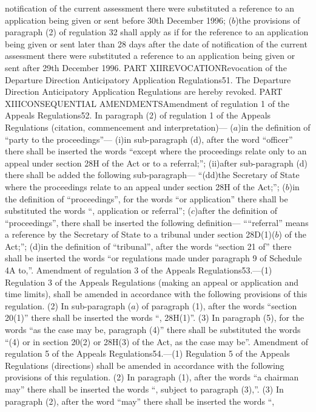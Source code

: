 \documentclass[a4paper]{article}
\begin{document}
notification of the current assessment there were substituted a reference to an
application being given or sent before 30th December 1996;
($b$)the provisions of paragraph (2) of regulation 32 shall apply as if for the
reference to an application being given or sent later than 28 days after the
date of notification of the current assessment there were substituted a
reference to an application being given or sent after 29th December 1996.
PART XIIREVOCATIONRevocation of the Departure Direction Anticipatory Application
Regulations51. The Departure Direction Anticipatory Application Regulations are
hereby revoked.
PART XIIICONSEQUENTIAL AMENDMENTSAmendment of regulation 1 of the Appeals
Regulations52. In paragraph (2) of regulation 1 of the Appeals Regulations
(citation, commencement and interpretation)—
($a$)in the definition of “party to the proceedings”—
(i)in sub-paragraph (d), after the word “officer” there shall be inserted the
words “except where the proceedings relate only to an appeal under section 28H
of the Act or to a referral;”;
(ii)after sub-paragraph (d) there shall be added the following sub-paragraph—
“(dd)the Secretary of State where the proceedings relate to an appeal under
section 28H of the Act;”;
($b$)in the definition of “proceedings”, for the words “or application” there
shall be substituted the words “, application or referral”;
($c$)after the definition of “proceedings”, there shall be inserted the following
definition—
““referral” means a reference by the Secretary of State to a tribunal under
section 28D(1)($b$) of the Act;”;
(d)in the definition of “tribunal”, after the words “section 21 of” there shall
be inserted the words “or regulations made under paragraph 9 of Schedule 4A
to,”.
Amendment of regulation 3 of the Appeals Regulations53.—(1) Regulation 3 of the
Appeals Regulations (making an appeal or application and time limits), shall be
amended in accordance with the following provisions of this regulation.
(2) In sub-paragraph ($a$) of paragraph (1), after the words “section 20(1)” there
shall be inserted the words “, 28H(1)”.
(3) In paragraph (5), for the words “as the case may be, paragraph (4)” there
shall be substituted the words “(4) or in section 20(2) or 28H(3) of the Act, as
the case may be”.
Amendment of regulation 5 of the Appeals Regulations54.—(1) Regulation 5 of the
Appeals Regulations (directions) shall be amended in accordance with the
following provisions of this regulation.
(2) In paragraph (1), after the words “a chairman may” there shall be inserted
the words “, subject to paragraph (3),”.
(3) In paragraph (2), after the word “may” there shall be inserted the words “,
\end{document}
